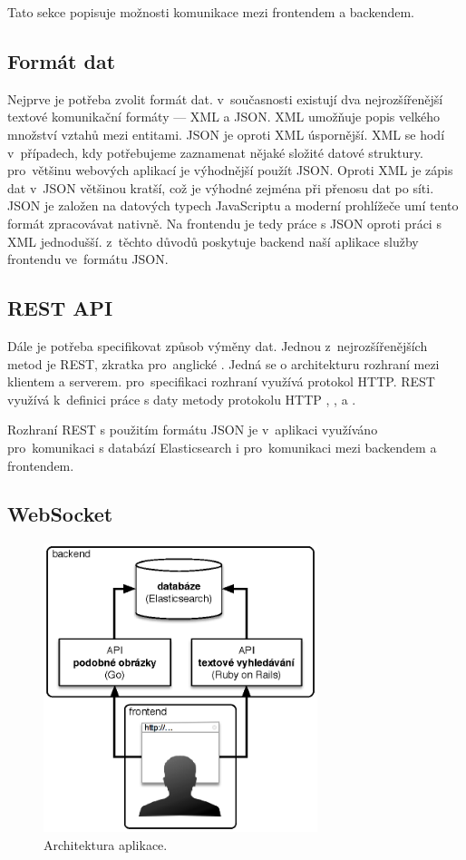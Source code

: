 Tato sekce popisuje možnosti komunikace mezi frontendem a backendem.

\subsection{Formát dat}

Nejprve je potřeba zvolit formát dat. v~současnosti existují dva nejrozšířenější textové komunikační formáty --- XML\cite{xml} a JSON\cite{json}. XML umožňuje popis velkého množství vztahů mezi entitami. JSON je oproti XML úspornější. XML se hodí v~případech, kdy potřebujeme zaznamenat nějaké složité datové struktury. pro~většinu webových aplikací je výhodnější použít JSON. Oproti XML je zápis dat v~JSON většinou kratší, což je výhodné zejména při přenosu dat po síti. JSON je založen na datových typech JavaScriptu a moderní prohlížeče umí tento formát zpracovávat nativně. Na frontendu je tedy práce s JSON oproti  práci s XML jednodušší. z~těchto důvodů poskytuje backend naší aplikace služby frontendu ve~formátu JSON.

\subsection{REST API}

Dále je potřeba specifikovat způsob výměny dat. Jednou z~nejrozšířenějších metod je REST, zkratka pro~anglické . Jedná se o architekturu rozhraní mezi klientem a serverem. pro~specifikaci rozhraní využívá protokol HTTP. REST využívá k~definici práce s daty metody protokolu HTTP , ,  a .

Rozhraní REST\cite{rest} s použitím formátu JSON je v~aplikaci využíváno pro~komunikaci s databází Elasticsearch i pro~komunikaci mezi backendem a frontendem.

\subsection{WebSocket}

\begin{figure}[h]
  \centering
  \includegraphics[width=80mm]{architecture.eps}
  \caption{Architektura aplikace.}
  \label{fig:architecture}
\end{figure}

